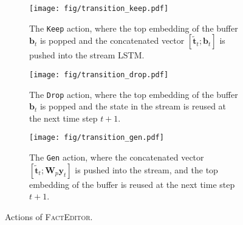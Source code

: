 \documentclass[11pt,a4paper]{article}
\begin{document}
\begin{figure}[t]
    \centering
    \begin{subfigure}[b]{0.99\linewidth}
        \centering
        \texttt{[image: fig/transition\_keep.pdf]}
        \caption{The \texttt{Keep} action, where the top embedding of the buffer $\boldsymbol{b}_t$ is popped and the concatenated vector $[\tilde{\boldsymbol{t}}_t;\boldsymbol{b}_t]$ is pushed into the stream \textsc{LSTM}.}
        \label{fig:keep}
    \end{subfigure}
    \hfill
    \begin{subfigure}[b]{0.99\linewidth}
        \centering
        \texttt{[image: fig/transition\_drop.pdf]}
        \caption{The \texttt{Drop} action, where the top embedding of the buffer $\boldsymbol{b}_t$ is popped and the state in the stream is reused at the next time step $t+1$.}
        \label{fig:drop}
    \end{subfigure}
    \hfill
    \begin{subfigure}[b]{0.99\linewidth}
        \centering
        \texttt{[image: fig/transition\_gen.pdf]}
        \caption{The \texttt{Gen} action, where the concatenated vector $[\tilde{\boldsymbol{t}}_t;\boldsymbol{W}_p\boldsymbol{y}_t]$ is pushed into the stream, and the top embedding of the buffer is reused at the next time step $t+1$.}
        \label{fig:gen}
    \end{subfigure}
    \caption{Actions of \textsc{FactEditor}.}
    \label{fig:model}
\end{figure}
\end{document}
